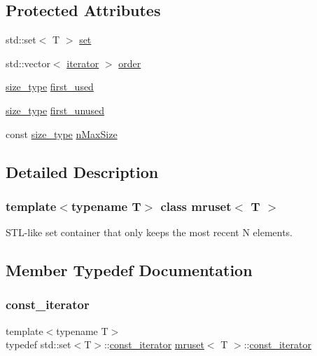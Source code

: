 \subsection*{Protected Attributes}
\begin{DoxyCompactItemize}
\item 
std\+::set$<$ T $>$ \mbox{\hyperlink{classmruset_a4981fc3556b61600418b2ddad98cc685}{set}}
\item 
std\+::vector$<$ \mbox{\hyperlink{classmruset_a246172eda1afff45be47a013c14b1ad6}{iterator}} $>$ \mbox{\hyperlink{classmruset_a7e78b5feab9c1b3736ef4b8b75e9853d}{order}}
\item 
\mbox{\hyperlink{classmruset_aaee46af18d8a5bdc503e9570e499a335}{size\+\_\+type}} \mbox{\hyperlink{classmruset_ad4c894f683cda5783c8be3aab3214cfd}{first\+\_\+used}}
\item 
\mbox{\hyperlink{classmruset_aaee46af18d8a5bdc503e9570e499a335}{size\+\_\+type}} \mbox{\hyperlink{classmruset_ac425858972aa64260e88d929b19d296d}{first\+\_\+unused}}
\item 
const \mbox{\hyperlink{classmruset_aaee46af18d8a5bdc503e9570e499a335}{size\+\_\+type}} \mbox{\hyperlink{classmruset_a96b4d730640dc1a78e5064eb1fab1c6d}{n\+Max\+Size}}
\end{DoxyCompactItemize}


\subsection{Detailed Description}
\subsubsection*{template$<$typename T$>$\newline
class mruset$<$ T $>$}

S\+T\+L-\/like set container that only keeps the most recent N elements. 

\subsection{Member Typedef Documentation}
\mbox{\label{classmruset_a74c77f7642e8e4db7cc79991c4345692}} 
\subsubsection{\texorpdfstring{const\+\_\+iterator}{const\_iterator}}
{\footnotesize\ttfamily template$<$typename T$>$ \\
typedef std\+::set$<$T$>$\+::\mbox{\hyperlink{classmruset_a74c77f7642e8e4db7cc79991c4345692}{const\+\_\+iterator}} \mbox{\hyperlink{classmruset}{mruset}}$<$ T $>$\+::\mbox{\hyperlink{classmruset_a74c77f7642e8e4db7cc79991c4345692}{const\+\_\+iterator}}}


